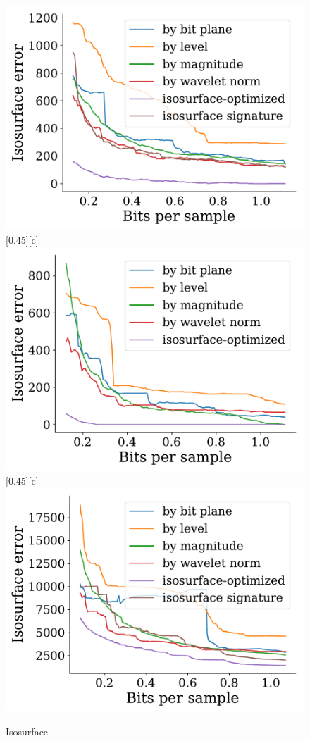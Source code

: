 \documentclass{article}
\begin{document}
\begin{figure}[htb]
{                \includegraphics[width=0.4\linewidth]{img/supplementary/isocontour-optimized-foam}}
        [0.45\linewidth][c]{%
                \includegraphics[width=0.4\linewidth]{img/supplementary/isocontour-optimized-karfs}}
        [0.45\linewidth][c]{%
                \includegraphics[width=0.4\linewidth]{img/supplementary/isocontour-optimized-kingsnake}}
        \caption{Isosurface}
\end{figure}
\end{document}
